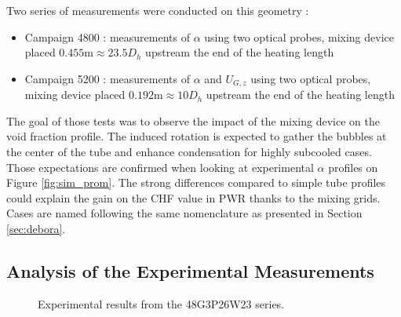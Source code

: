 Two series of measurements were conducted on this geometry : 

\begin{itemize}
\item Campaign 4800 : measurements of $\alpha$ using two optical probes, mixing device placed $0.455\text{m}\approx 23.5D_{h}$ upstream the end of the heating length
\item Campaign 5200 : measurements of $\alpha$ and $U_{G,z}$ using two optical probes, mixing device placed $0.192\text{m}\approx 10D_{h}$ upstream the end of the heating length
\end{itemize}

The goal of those tests was to observe the impact of the mixing device on the void fraction profile. The induced rotation is expected to gather the bubbles at the center of the tube and enhance condensation for highly subcooled cases. Those expectations are confirmed when looking at experimental $\alpha$ profiles on Figure \ref{fig:sim_prom}. The strong differences compared to simple tube profiles could explain the gain on the CHF value in PWR thanks to the mixing grids. Cases are named following the same nomenclature as presented in Section \ref{sec:debora}.

\subsection{Analysis of the Experimental Measurements}



\begin{figure}[!h]
\centering
{}

\caption{Experimental results from the 48G3P26W23 series.}
\label{fig:exp_48G3P26W23}
\end{figure}


